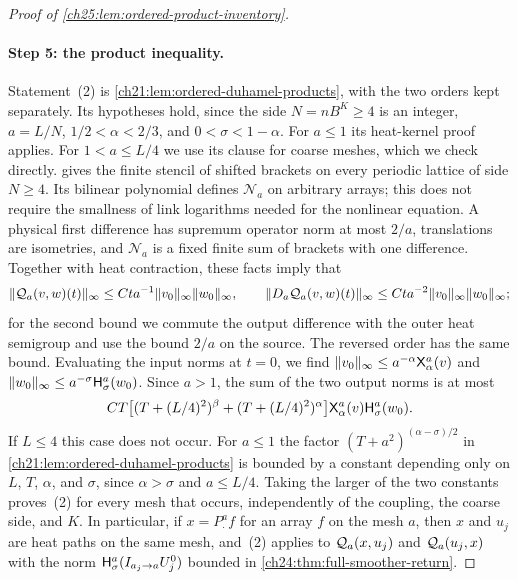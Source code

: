 \begin{proof}[Proof of \cref{ch25:lem:ordered-product-inventory}]
\paragraph{Step 5: the product inequality.}
Statement~(2) is \cref{ch21:lem:ordered-duhamel-products}, with the two orders kept separately. Its hypotheses hold, since the side $N=nB^K\ge4$ is an integer, $a=L/N$, $1/2<\alpha<2/3$, and $0<\sigma<1-\alpha$. For $a\le1$ its heat-kernel proof applies. For $1<a\le L/4$ we use its clause for coarse meshes, which we check directly.  gives the finite stencil of shifted brackets on every periodic lattice of side $N\ge4$. Its bilinear polynomial defines $\mathcal N_a$ on arbitrary arrays; this does not require the smallness of link logarithms needed for the nonlinear equation. A physical first difference has supremum operator norm at most $2/a$, translations are isometries, and $\mathcal N_a$ is a fixed finite sum of brackets with one difference. Together with heat contraction, these facts imply that
\[
 \lVert \mathcal Q_{a}(v,w)(t)\rVert_\infty\le Cta^{-1}\lVert v_0\rVert_\infty\lVert w_0\rVert_\infty,\qquad
 \lVert D_a\mathcal Q_{a}(v,w)(t)\rVert_\infty\le Cta^{-2}\lVert v_0\rVert_\infty\lVert w_0\rVert_\infty;
\]
for the second bound we commute the output difference with the outer heat semigroup and use the bound $2/a$ on the source. The reversed order has the same bound. Evaluating the input norms at $t=0$, we find $\lVert v_0\rVert_\infty\le a^{-\alpha}\mathsf X_{\alpha}^{a}(v)$ and $\lVert w_0\rVert_\infty\le a^{-\sigma}\mathsf H_{\sigma}^{a}(w_0)$. Since $a>1$, the sum of the two output norms is at most
\begin{equation}\label{ch25:eq:coarse-ordered-product}
 CT\bigl[(T+(L/4)^2)^\beta+(T+(L/4)^2)^\alpha\bigr]\mathsf X_{\alpha}^{a}(v)\mathsf H_{\sigma}^{a}(w_0).
\end{equation}
If $L\le4$ this case does not occur. For $a\le1$ the factor $(T+a^2)^{(\alpha-\sigma)/2}$ in \cref{ch21:lem:ordered-duhamel-products} is bounded by a constant depending only on $L$, $T$, $\alpha$, and $\sigma$, since $\alpha>\sigma$ and $a\le L/4$. Taking the larger of the two constants proves~(2) for every mesh that occurs, independently of the coupling, the coarse side, and $K$. In particular, if $x=P^a_\cdot f$ for an array $f$ on the mesh $a$, then $x$ and $u_j$ are heat paths on the same mesh, and~(2) applies to $\mathcal Q_{a}(x,u_j)$ and $\mathcal Q_{a}(u_j,x)$ with the norm $\mathsf H_{\sigma}^{a}(I_{a_j\to a}U_j^0)$ bounded in \cref{ch24:thm:full-smoother-return}.


\end{proof}
